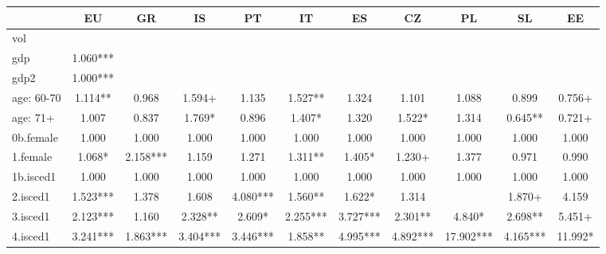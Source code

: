{
\def\sym#1{\ifmmode^{#1}\else\(^{#1}\)\fi}
\begin{tabular}{l*{10}{c}}
\hline\hline
            &\multicolumn{1}{c}{EU}&\multicolumn{1}{c}{GR}&\multicolumn{1}{c}{IS}&\multicolumn{1}{c}{PT}&\multicolumn{1}{c}{IT}&\multicolumn{1}{c}{ES}&\multicolumn{1}{c}{CZ}&\multicolumn{1}{c}{PL}&\multicolumn{1}{c}{SL}&\multicolumn{1}{c}{EE}\\
\hline
vol         &               &               &               &               &               &               &               &               &               &               \\
gdp         &       1.060***&               &               &               &               &               &               &               &               &               \\
gdp2        &       1.000***&               &               &               &               &               &               &               &               &               \\
age: 60-70  &       1.114** &       0.968   &       1.594+  &       1.135   &       1.527** &       1.324   &       1.101   &       1.088   &       0.899   &       0.756+  \\
age: 71+    &       1.007   &       0.837   &       1.769*  &       0.896   &       1.407*  &       1.320   &       1.522*  &       1.314   &       0.645** &       0.721+  \\
0b.female   &       1.000   &       1.000   &       1.000   &       1.000   &       1.000   &       1.000   &       1.000   &       1.000   &       1.000   &       1.000   \\
1.female    &       1.068*  &       2.158***&       1.159   &       1.271   &       1.311** &       1.405*  &       1.230+  &       1.377   &       0.971   &       0.990   \\
1b.isced1   &       1.000   &       1.000   &       1.000   &       1.000   &       1.000   &       1.000   &       1.000   &       1.000   &       1.000   &       1.000   \\
2.isced1    &       1.523***&       1.378   &       1.608   &       4.080***&       1.560** &       1.622*  &       1.314   &               &       1.870+  &       4.159   \\
3.isced1    &       2.123***&       1.160   &       2.328** &       2.609*  &       2.255***&       3.727***&       2.301** &       4.840*  &       2.698** &       5.451+  \\
4.isced1    &       3.241***&       1.863***&       3.404***&       3.446***&       1.858** &       4.995***&       4.892***&      17.902***&       4.165***&      11.992*  \\

\end{tabular}}
